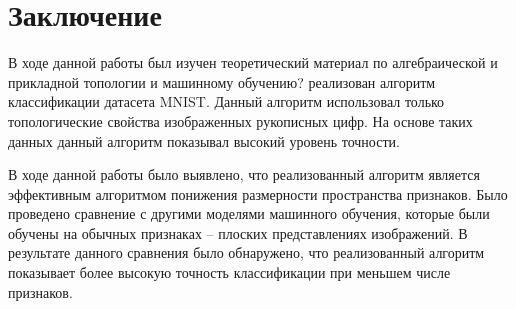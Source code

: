 \chapter*{Заключение}
В ходе данной работы был изучен теоретический материал по алгебраической и прикладной топологии и машинному обучению? реализован алгоритм классификации датасета MNIST. Данный алгоритм использовал только топологические свойства изображенных рукописных цифр. На основе таких данных данный алгоритм показывал высокий уровень точности.

В ходе данной работы было выявлено, что реализованный алгоритм является эффективным алгоритмом понижения размерности пространства признаков. Было проведено сравнение с другими моделями машинного обучения, которые были обучены на обычных признаках -- плоских представлениях изображений. В результате данного сравнения было обнаружено, что реализованный алгоритм показывает более высокую точность классификации при меньшем числе признаков.

